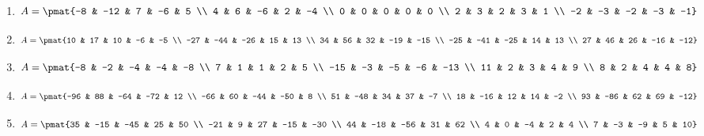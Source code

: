 \begin{enumerate}
\item

\begin{align*}
A = \pmat{-8 & -12 & 7 & -6 & 5 \\ 4 & 6 & -6 & 2 & -4 \\ 0 & 0 & 0 & 0 & 0 \\ 2 & 3 & 2 & 3 & 1 \\ -2 & -3 & -2 & -3 & -1}
\end{align*}

\item

\begin{align*}
A = \pmat{10 & 17 & 10 & -6 & -5 \\ -27 & -44 & -26 & 15 & 13 \\ 34 & 56 & 32 & -19 & -15 \\ -25 & -41 & -25 & 14 & 13 \\ 27 & 46 & 26 & -16 & -12}
\end{align*}

\item

\begin{align*}
A = \pmat{-8 & -2 & -4 & -4 & -8 \\ 7 & 1 & 1 & 2 & 5 \\ -15 & -3 & -5 & -6 & -13 \\ 11 & 2 & 3 & 4 & 9 \\ 8 & 2 & 4 & 4 & 8}
\end{align*}

\item

\begin{align*}
A = \pmat{-96 & 88 & -64 & -72 & 12 \\ -66 & 60 & -44 & -50 & 8 \\ 51 & -48 & 34 & 37 & -7 \\ 18 & -16 & 12 & 14 & -2 \\ 93 & -86 & 62 & 69 & -12}
\end{align*}

\item

\begin{align*}
A = \pmat{35 & -15 & -45 & 25 & 50 \\ -21 & 9 & 27 & -15 & -30 \\ 44 & -18 & -56 & 31 & 62 \\ 4 & 0 & -4 & 2 & 4 \\ 7 & -3 & -9 & 5 & 10}
\end{align*}


\end{enumerate}
